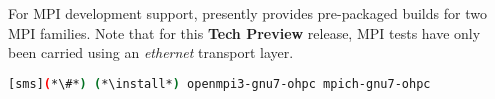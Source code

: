 For MPI development support, \OHPC{} presently provides pre-packaged builds for
two MPI families. Note that for this {\bf Tech Preview} release, MPI tests have only been
carried using an {\em ethernet} transport layer.

\begin{lstlisting}[language=bash]
[sms](*\#*) (*\install*) openmpi3-gnu7-ohpc mpich-gnu7-ohpc
\end{lstlisting}



